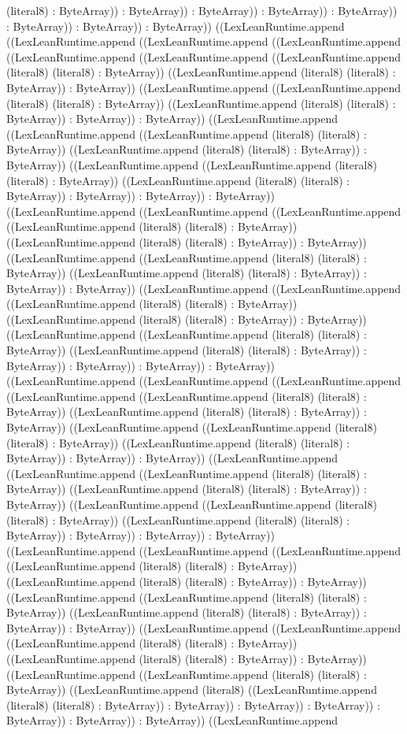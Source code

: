 \documentclass[11pt]{article}
\begin{document}
(literal8) : ByteArray)) : ByteArray)) : ByteArray)) : ByteArray)) : ByteArray)) : ByteArray)) : ByteArray)) : ByteArray)) ((LexLeanRuntime.append ((LexLeanRuntime.append ((LexLeanRuntime.append ((LexLeanRuntime.append ((LexLeanRuntime.append ((LexLeanRuntime.append ((LexLeanRuntime.append (literal8) (literal8) : ByteArray)) ((LexLeanRuntime.append (literal8) (literal8) : ByteArray)) : ByteArray)) ((LexLeanRuntime.append ((LexLeanRuntime.append (literal8) (literal8) : ByteArray)) ((LexLeanRuntime.append (literal8) (literal8) : ByteArray)) : ByteArray)) : ByteArray)) ((LexLeanRuntime.append ((LexLeanRuntime.append ((LexLeanRuntime.append (literal8) (literal8) : ByteArray)) ((LexLeanRuntime.append (literal8) (literal8) : ByteArray)) : ByteArray)) ((LexLeanRuntime.append ((LexLeanRuntime.append (literal8) (literal8) : ByteArray)) ((LexLeanRuntime.append (literal8) (literal8) : ByteArray)) : ByteArray)) : ByteArray)) : ByteArray)) ((LexLeanRuntime.append ((LexLeanRuntime.append ((LexLeanRuntime.append ((LexLeanRuntime.append (literal8) (literal8) : ByteArray)) ((LexLeanRuntime.append (literal8) (literal8) : ByteArray)) : ByteArray)) ((LexLeanRuntime.append ((LexLeanRuntime.append (literal8) (literal8) : ByteArray)) ((LexLeanRuntime.append (literal8) (literal8) : ByteArray)) : ByteArray)) : ByteArray)) ((LexLeanRuntime.append ((LexLeanRuntime.append ((LexLeanRuntime.append (literal8) (literal8) : ByteArray)) ((LexLeanRuntime.append (literal8) (literal8) : ByteArray)) : ByteArray)) ((LexLeanRuntime.append ((LexLeanRuntime.append (literal8) (literal8) : ByteArray)) ((LexLeanRuntime.append (literal8) (literal8) : ByteArray)) : ByteArray)) : ByteArray)) : ByteArray)) : ByteArray)) ((LexLeanRuntime.append ((LexLeanRuntime.append ((LexLeanRuntime.append ((LexLeanRuntime.append ((LexLeanRuntime.append (literal8) (literal8) : ByteArray)) ((LexLeanRuntime.append (literal8) (literal8) : ByteArray)) : ByteArray)) ((LexLeanRuntime.append ((LexLeanRuntime.append (literal8) (literal8) : ByteArray)) ((LexLeanRuntime.append (literal8) (literal8) : ByteArray)) : ByteArray)) : ByteArray)) ((LexLeanRuntime.append ((LexLeanRuntime.append ((LexLeanRuntime.append (literal8) (literal8) : ByteArray)) ((LexLeanRuntime.append (literal8) (literal8) : ByteArray)) : ByteArray)) ((LexLeanRuntime.append ((LexLeanRuntime.append (literal8) (literal8) : ByteArray)) ((LexLeanRuntime.append (literal8) (literal8) : ByteArray)) : ByteArray)) : ByteArray)) : ByteArray)) ((LexLeanRuntime.append ((LexLeanRuntime.append ((LexLeanRuntime.append ((LexLeanRuntime.append (literal8) (literal8) : ByteArray)) ((LexLeanRuntime.append (literal8) (literal8) : ByteArray)) : ByteArray)) ((LexLeanRuntime.append ((LexLeanRuntime.append (literal8) (literal8) : ByteArray)) ((LexLeanRuntime.append (literal8) (literal8) : ByteArray)) : ByteArray)) : ByteArray)) ((LexLeanRuntime.append ((LexLeanRuntime.append ((LexLeanRuntime.append (literal8) (literal8) : ByteArray)) ((LexLeanRuntime.append (literal8) (literal8) : ByteArray)) : ByteArray)) ((LexLeanRuntime.append ((LexLeanRuntime.append (literal8) (literal8) : ByteArray)) ((LexLeanRuntime.append (literal8) ((LexLeanRuntime.append (literal8) (literal8) : ByteArray)) : ByteArray)) : ByteArray)) : ByteArray)) : ByteArray)) : ByteArray)) : ByteArray)) ((LexLeanRuntime.append 
\end{document}
